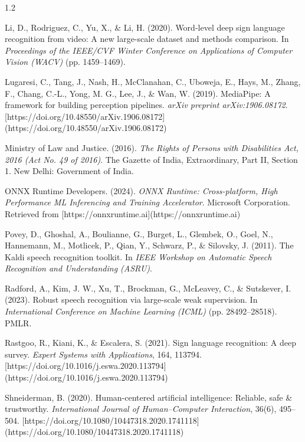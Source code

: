 \documentclass[12pt,a4paper]{report}
\begin{document}
\begin{spacing}{1.2}
\begin{enumerate}[label={[\arabic*]}, leftmargin=2.5em, itemsep=2pt]
\item Li, D., Rodriguez, C., Yu, X., \& Li, H. (2020). Word-level deep sign language recognition from video: A new large-scale dataset and methods comparison. In \textit{Proceedings of the IEEE/CVF Winter Conference on Applications of Computer Vision (WACV)} (pp. 1459--1469).

\item Lugaresi, C., Tang, J., Nash, H., McClanahan, C., Uboweja, E., Hays, M., Zhang, F., Chang, C.-L., Yong, M. G., Lee, J., \& Wan, W. (2019). MediaPipe: A framework for building perception pipelines. \textit{arXiv preprint arXiv:1906.08172}. [https://doi.org/10.48550/arXiv.1906.08172](https://doi.org/10.48550/arXiv.1906.08172)

\item Ministry of Law and Justice. (2016). \textit{The Rights of Persons with Disabilities Act, 2016 (Act No. 49 of 2016)}. The Gazette of India, Extraordinary, Part II, Section 1. New Delhi: Government of India.

\item ONNX Runtime Developers. (2024). \textit{ONNX Runtime: Cross-platform, High Performance ML Inferencing and Training Accelerator}. Microsoft Corporation. Retrieved from [https://onnxruntime.ai](https://onnxruntime.ai)

\item Povey, D., Ghoshal, A., Boulianne, G., Burget, L., Glembek, O., Goel, N., Hannemann, M., Motlicek, P., Qian, Y., Schwarz, P., \& Silovsky, J. (2011). The Kaldi speech recognition toolkit. In \textit{IEEE Workshop on Automatic Speech Recognition and Understanding (ASRU)}.

\item Radford, A., Kim, J. W., Xu, T., Brockman, G., McLeavey, C., \& Sutskever, I. (2023). Robust speech recognition via large-scale weak supervision. In \textit{International Conference on Machine Learning (ICML)} (pp. 28492--28518). PMLR.

\item Rastgoo, R., Kiani, K., \& Escalera, S. (2021). Sign language recognition: A deep survey. \textit{Expert Systems with Applications}, 164, 113794. [https://doi.org/10.1016/j.eswa.2020.113794](https://doi.org/10.1016/j.eswa.2020.113794)

\item Shneiderman, B. (2020). Human-centered artificial intelligence: Reliable, safe \& trustworthy. \textit{International Journal of Human--Computer Interaction}, 36(6), 495--504. [https://doi.org/10.1080/10447318.2020.1741118](https://doi.org/10.1080/10447318.2020.1741118)


\end{enumerate}
\end{spacing}
\end{document}
